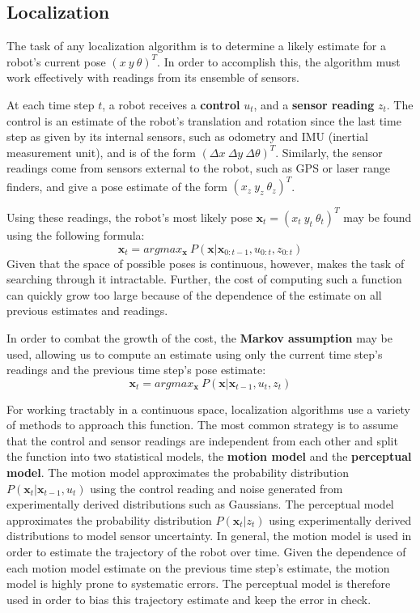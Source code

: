 \documentclass[letterpaper, 10 pt, conference]{ieeeconf}  %
\begin{document}
\subsection{Localization}
The task of any localization algorithm is to determine a likely estimate for a robot's current pose $(x~y~\theta)^T$. In order to accomplish this, the algorithm must work effectively with readings from its ensemble of sensors. 
\par
At each time step $t$, a robot receives a \textbf{control} $u_t$, and a \textbf{sensor reading} $z_t$. The control is an estimate of the robot's translation and rotation since the last time step as given by its internal sensors, such as odometry and IMU (inertial measurement unit), and is of the form $(\Delta x~\Delta y~\Delta \theta)^T$. Similarly, the sensor readings come from sensors external to the robot, such as GPS or laser range finders, and give a pose estimate of the form $(x_z~y_z~\theta _z)^T$. 
\par 
Using these readings, the robot's most likely pose $\textbf{x}_t=(x_t~y_t~\theta _t)^T$ may be found using the following formula: 
$$
\textbf{x}_t = argmax_{\textbf{x}}~P(\textbf{x}|\textbf{x}_{0:t-1}, u_{0:t}, z_{0:t})
$$
Given that the space of possible poses is continuous, however, makes the task of searching through it intractable. Further, the cost of computing such a function can quickly grow too large because of the dependence of the estimate on all previous estimates and readings. 
\par
In order to combat the growth of the cost, the \textbf{Markov assumption} may be used, allowing us to compute an estimate using only the current time step's readings and the previous time step's pose estimate:
$$
\textbf{x}_t = argmax_{\textbf{x}}~P(\textbf{x}|\textbf{x}_{t-1}, u_t, z_t)
$$
\par
For working tractably in a continuous space, localization algorithms use a variety of methods to approach this function. The most common strategy is to assume that the control and sensor readings are independent from each other and split the function into two statistical models, the \textbf{motion model} and the \textbf{perceptual model}. The motion model approximates the probability distribution $P(\textbf{x}_t|\textbf{x}_{t-1},u_t)$ using the control reading and noise generated from experimentally derived distributions such as Gaussians. The perceptual model approximates the probability distribution $P(\textbf{x}_t|z_t)$ using experimentally derived distributions to model sensor uncertainty. In general, the motion model is used in order to estimate the trajectory of the robot over time. Given the dependence of each motion model estimate on the previous time step's estimate, the motion model is highly prone to systematic errors. The perceptual model is therefore used in order to bias this trajectory estimate and keep the error in check. 
\end{document}
